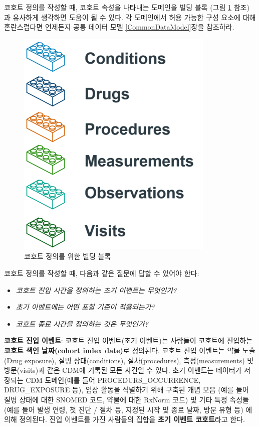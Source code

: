 \documentclass[11pt]{book}
\providecommand{\tightlist}{%
  \setlength{\itemsep}{0pt}\setlength{\parskip}{0pt}}
\theoremstyle{definition}
\theoremstyle{definition}
\theoremstyle{definition}
\theoremstyle{remark}
\begin{document}
코호트 정의를 작성할 때, 코호트 속성을 나타내는 도메인을 빌딩 블록 (그림
\ref{fig:cohortLegos} 참조) 과 유사하게 생각하면 도움이 될 수 있다. 각
도메인에서 허용 가능한 구성 요소에 대해 혼란스럽다면 언제든지 공통
데이터 모델 \ref{CommonDataModel}장을 참조하라.

\begin{figure}

{\centering \includegraphics[width=0.5\linewidth]{images/Cohorts/cohort-legos} 

}

\caption{코호트 정의를 위한 빌딩 블록}\label{fig:cohortLegos}
\end{figure}

코호트 정의를 작성할 때, 다음과 같은 질문에 답할 수 있어야 한다:

\begin{itemize}
\tightlist
\item
  \emph{코호트 진입 시간을 정의하는 초기 이벤트는 무엇인가?}
\item
  \emph{초기 이벤트에는 어떤 포함 기준이 적용되는가?}
\item
  \emph{코호트 종료 시간을 정의하는 것은 무엇인가?}
\end{itemize}

\textbf{코호트 진입 이벤트}: 코호트 진입 이벤트(초기 이벤트)는 사람들이
코호트에 진입하는 \textbf{코호트 색인 날짜(cohort index date)}로
정의된다. 코호트 진입 이벤트는 약물 노출(Drug exposure), 질병
상태(conditions), 절차(procedures), 측정(measurements) 및 방문(visits)과
같은 CDM에 기록된 모든 사건일 수 있다. 초기 이벤트는 데이터가 저장되는
CDM 도메인(예를 들어 PROCEDURS\_OCCURRENCE, DRUG\_EXPOSURE 등), 임상
활동을 식별하기 위해 구축된 개념 모음 (예를 들어 질병 상태에 대한 SNOMED
코드, 약물에 대한 RxNorm 코드) 및 기타 특정 속성들 (예를 들어 발생 연령,
첫 진단 / 절차 등, 지정된 시작 및 종료 날짜, 방문 유형 등) 에 의해
정의된다. 진입 이벤트를 가진 사람들의 집합을 \textbf{초기 이벤트
코호트}라고 한다. 
\end{document}
